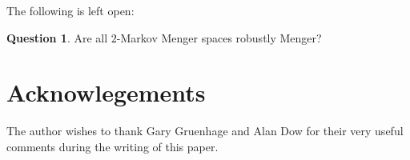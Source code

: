 \documentclass{amsart}
\theoremstyle{definition}
\newtheorem{question}[theorem]{Question}
\begin{document}
The following is left open:

\begin{question}
  Are all \(2\)-Markov Menger spaces
  robustly Menger?
\end{question}

\section*{Acknowlegements}

The author wishes to thank Gary Gruenhage and Alan Dow for their
very useful comments during the writing of this paper.



\end{document}
